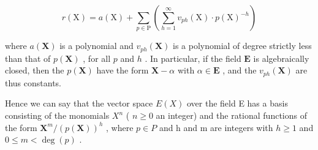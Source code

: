\[
r (\mathrm{X}) = a (\mathrm{X}) + \sum_ {p \in \mathrm{P}} \left(\sum_ {h = 1} ^ {\infty} v _ {p h} (\mathrm{X}) \cdot p (\mathrm{X}) ^ {- h}\right)
\]

where \(a(\mathbf{X})\) is a polynomial and \(v_{ph}(\mathbf{X})\) is a polynomial of degree strictly less than that of \(p(\mathbf{X})\) , for all \(p\) and \(h\) . In particular, if the field \(\mathbf{E}\) is algebraically closed, then the \(p(\mathbf{X})\) have the form \(\mathbf{X} - \alpha\) with \(\alpha \in \mathbf{E}\) , and the \(v_{ph}(\mathbf{X})\) are thus constants.

Hence we can say that the vector space \(E(X)\) over the field E has a basis consisting of the monomials \(X^{n}\) ( \(n \geqslant 0\) an integer) and the rational functions of the form \(\mathbf{X}^{m}/(p(\mathbf{X}))^{h}\) , where \(p \in P\) and h and m are integers with \(h \geqslant 1\) and \(0 \leqslant m < \deg(p)\) .


